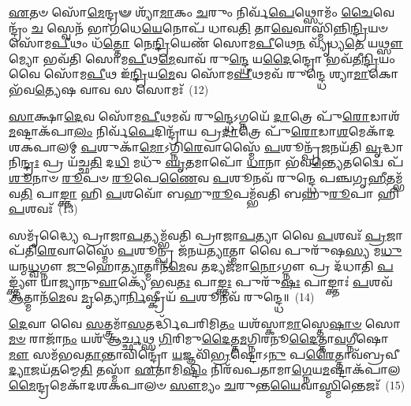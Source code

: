 \-\ul{𑌏}\-𑌤𑍞 𑌸𑍋᳴\-\ul{𑌮𑍇}\-𑌨𑍍𑌦𑍍𑌰𑍟 𑌶𑍍𑌯𑌾᳴\-\ul{𑌮𑌾}\-𑌕𑌂 \ul{𑌚}\-𑌰𑍁𑌂 𑌨𑌿𑌰𑍍𑌵᳴\-\ul{𑌪𑍇}\-𑌥𑍍𑌸𑍋𑌮𑌂᳴ \ul{𑌚𑍈}\-𑌵𑍇𑌨𑍍𑌦𑍍𑌰𑌂᳴ \ul{𑌚} 𑌸𑍍𑌵𑍇𑌨᳴ 𑌭𑌾\-\ul{𑌗}\-𑌧𑍇\-\ul{𑌯𑍇}\-𑌨𑍋𑌪᳴ 𑌧𑌾𑌵\-\ul{𑌤𑌿} 𑌤𑌾\-\ul{𑌵𑍇}\-𑌵𑌾𑌸𑍍𑌮𑌿᳴𑌨𑍍𑌨𑌿\-\ul{𑌨𑍍𑌦𑍍𑌰𑌿}\-𑌯𑍞 𑌸𑍋᳴𑌮\-\ul{𑌪𑍀}\-𑌥𑌂 𑌧᳴\-\ul{𑌤𑍍𑌤𑍋} 𑌨𑍇\-\ul{𑌨𑍍𑌦𑍍𑌰𑌿}\-𑌯𑍇𑌣᳴ 𑌸𑍋𑌮\-\ul{𑌪𑍀}\-𑌥𑍇\-\ul{𑌨} 𑌵𑍍𑌯𑍃᳴𑌧𑍍𑌯\-\ul{𑌤𑍇} 𑌯\-\ul{𑌥𑍍𑌸𑍗}\-𑌮𑍍𑌯𑍋 𑌭𑌵᳴𑌤𑌿 𑌸𑍋𑌮\-\ul{𑌪𑍀}\-𑌥\-\ul{𑌮𑍇}\-𑌵𑌾𑌵᳴ 𑌰𑍁\-\ul{𑌨𑍍𑌦𑍍𑌧𑍇} 𑌯\-\ul{𑌦𑍈}\-𑌨𑍍𑌦𑍍𑌰𑍋 𑌭𑌵᳴𑌤𑍀\-\ul{𑌨𑍍𑌦𑍍𑌰𑌿}\-𑌯𑌂 𑌵𑍈 𑌸𑍋᳴𑌮\-\ul{𑌪𑍀}\-𑌥 𑌇᳴\-\ul{𑌨𑍍𑌦𑍍𑌰𑌿}\-𑌯\-\ul{𑌮𑍇}\-𑌵 𑌸𑍋᳴𑌮\-\ul{𑌪𑍀}\-𑌥𑌮𑌵᳴ 𑌰𑍁𑌨𑍍𑌦𑍍𑌧𑍇 𑌶𑍍𑌯𑌾\-\ul{𑌮𑌾}\-𑌕𑍋 𑌭᳴𑌵\-\ul{𑌤𑍍𑌯𑍇}\-𑌷 𑌵𑌾𑌵 𑌸 𑌸𑍋𑌮𑌃᳴~(12)

\-\ul{𑌸𑌾}\-𑌕𑍍𑌷𑌾\-\ul{𑌦𑍇}\-𑌵 𑌸𑍋᳴𑌮\-\ul{𑌪𑍀}\-𑌥𑌮𑌵᳴ 𑌰𑍁\-\ul{𑌨𑍍𑌦𑍍𑌧𑍇}\-\-𑌽𑌗𑍍𑌨𑌯𑍇᳴ \ul{𑌦𑌾}\-𑌤𑍍𑌰𑍇 𑌪𑍁᳴\-\ul{𑌰𑍋}\-𑌡𑌾𑌶᳴\-\ul{𑌮}\-𑌷𑍍𑌟𑌾\-𑌕᳴𑌪𑌾\-\ul{𑌲𑌂} 𑌨𑌿𑌰𑍍𑌵᳴\-\ul{𑌪𑍇}\-𑌦𑌿𑌨𑍍𑌦𑍍𑌰𑌾᳴𑌯 𑌪𑍍𑌰\-\ul{𑌦𑌾}\-𑌤𑍍𑌰𑍇 𑌪𑍁᳴\-\ul{𑌰𑍋}\-𑌡𑌾\-\ul{𑌶}\-𑌮𑍇𑌕𑌾᳴\-𑌦𑌶\-𑌕𑌪𑌾𑌲𑌮𑍍 \ul{𑌪}\-𑌶𑍁𑌕𑌾᳴\-\ul{𑌮𑍋}\-\-𑌽𑌗𑍍𑌨𑌿\-\ul{𑌰𑍇}\-𑌵𑌾𑌸𑍍𑌮𑍈᳴ \ul{𑌪}\-𑌶𑍂𑌨𑍍𑌪𑍍𑌰᳴\-\ul{𑌜}\-𑌨𑌯᳴𑌤𑌿 \ul{𑌵𑍃}\-𑌦𑍍𑌧𑌾𑌨𑌿\-\ul{𑌨𑍍𑌦𑍍𑌰𑌃} 𑌪𑍍𑌰 𑌯᳴𑌚𑍍𑌛\-\ul{𑌤𑌿} 𑌦\-\ul{𑌧𑌿} 𑌮𑌧𑍁᳴ \ul{𑌘𑍃}\-𑌤𑌮𑌾𑌪𑍋᳴ \ul{𑌧𑌾}\-𑌨𑌾 𑌭᳴𑌵\-\ul{𑌨𑍍𑌤𑍍𑌯𑍇}\-𑌤𑌦𑍍𑌵𑍈 𑌪᳴\-\ul{𑌶𑍂}\-𑌨𑌾𑍞 \ul{𑌰𑍂}\-𑌪𑍞 \ul{𑌰𑍂}\-𑌪𑍇\-\ul{𑌣𑍈}\-𑌵 \ul{𑌪}\-𑌶𑍂𑌨𑌵᳴ 𑌰𑍁𑌨𑍍𑌦𑍍𑌧𑍇 𑌪𑌞𑍍𑌚𑌗𑍃\-\ul{𑌹𑍀}\-𑌤𑌮𑍍𑌭᳴𑌵\-\ul{𑌤𑌿} 𑌪𑌾\-\ul{𑌙𑍍𑌕𑍍𑌤𑌾} 𑌹𑌿 \ul{𑌪}\-𑌶𑌵𑍋᳴ 𑌬𑌹𑍁\-\ul{𑌰𑍂}\-𑌪𑌮𑍍𑌭᳴𑌵𑌤𑌿 𑌬𑌹𑍁\-\ul{𑌰𑍂}\-𑌪𑌾 𑌹𑌿 \ul{𑌪}\-𑌶𑌵𑌃᳴~(13)

𑌸𑌮𑍃᳴𑌦𑍍𑌧𑍍𑌯𑍈 𑌪𑍍𑌰𑌾𑌜𑌾\-\ul{𑌪}\-𑌤𑍍𑌯𑌮𑍍𑌭᳴𑌵𑌤𑌿 𑌪𑍍𑌰𑌾𑌜𑌾\-\ul{𑌪}\-𑌤𑍍𑌯𑌾 𑌵𑍈 \ul{𑌪}\-𑌶𑌵𑌃᳴ \ul{𑌪𑍍𑌰}\-𑌜𑌾𑌪᳴𑌤𑌿\-\ul{𑌰𑍇}\-𑌵𑌾𑌸𑍍𑌮𑍈᳴ \ul{𑌪}\-𑌶𑍂𑌨𑍍𑌪𑍍𑌰 𑌜᳴𑌨𑌯\-\ul{𑌤𑍍𑌯𑌾}\-𑌤𑍍𑌮𑌾 𑌵𑍈 𑌪𑍁𑌰𑍁᳴𑌷\-\ul{𑌸𑍍𑌯} 𑌮\-\ul{𑌧𑍁} 𑌯𑌨𑍍𑌮\-\ul{𑌧𑍍𑌵}\-𑌗𑍍𑌨𑍗 \ul{𑌜𑍁}\-𑌹𑍋\-\ul{𑌤𑍍𑌯𑌾}\-𑌤𑍍𑌮𑌾𑌨᳴\-\ul{𑌮𑍇}\-𑌵 𑌤𑌦𑍍𑌯𑌜᳴𑌮𑌾\-\ul{𑌨𑍋}\-\-𑌽𑌗𑍍𑌨𑍗 𑌪𑍍𑌰 𑌦᳴𑌧𑌾𑌤𑌿 \ul{𑌪}\-𑌙𑍍𑌕𑍍𑌤𑍍𑌯𑍗᳴ 𑌯𑌾𑌜𑍍𑌯𑌾𑌨𑍁\-\ul{𑌵𑌾}\-𑌕𑍍𑌯𑍇᳴ 𑌭𑌵\-\ul{𑌤𑌃} 𑌪𑌾\-\ul{𑌙𑍍𑌕𑍍𑌤𑌃} 𑌪𑍁𑌰𑍁᳴\-\ul{𑌷𑌃} 𑌪𑌾𑌙𑍍𑌕𑍍𑌤𑌾𑌃॑ \ul{𑌪}\-𑌶𑌵᳴ \ul{𑌆}\-𑌤𑍍𑌮𑌾𑌨᳴\-\ul{𑌮𑍇}\-𑌵 \ul{𑌮𑍃}\-𑌤𑍍𑌯𑍋\-\ul{𑌰𑍍𑌨𑌿}\-𑌷𑍍𑌕𑍍𑌰𑍀𑌯᳴ \ul{𑌪}\-𑌶𑍂𑌨𑌵᳴ 𑌰𑍁𑌨𑍍𑌦𑍍𑌧𑍇॥~(14)

{\anuvakamend[{\-\ul{𑌇}\-\-\ul{𑌨𑍍𑌦𑍍𑌰𑌿}\-𑌯𑍇॑\-𑌽\-\ul{𑌸𑍍𑌮𑌿}\-𑌨𑍍𑌭𑍂𑌮𑍍𑌯𑌾᳴ \ul{𑌏}\-𑌤𑌾𑌮𑌿\-\ul{𑌨𑍍𑌦𑍍𑌰𑌃} 𑌸𑍍𑌯𑌾𑌤𑍍𑌤\-\ul{𑌸𑍍𑌮𑍈} 𑌸𑍋𑌮𑍋᳴ 𑌬𑌹𑍁\-\ul{𑌰𑍂}\-𑌪𑌾 𑌹𑌿 \ul{𑌪}\-𑌶\-\ul{𑌵} 𑌏𑌕᳴𑌚𑌤𑍍𑌵𑌾𑌰𑌿𑍞𑌶𑌚𑍍𑌚}]}%

\-\ul{𑌦𑍇}\-𑌵𑌾 𑌵𑍈 \ul{𑌸}\-𑌤𑍍𑌤𑍍𑌰𑌮𑌾᳴\-\ul{𑌸}\-𑌤𑌰𑍍𑌦𑍍𑌧𑌿᳴𑌪𑌰𑌿𑌮𑌿\-\ul{𑌤𑌂} 𑌯𑌶᳴𑌸𑍍𑌕𑌾\-\ul{𑌮𑌾}\-𑌸𑍍𑌤𑍇\-\ul{𑌷𑌾}\-\-\ul{𑍞} 𑌸𑍋\-\ul{𑌮}\-\-\ul{𑍞} 𑌰𑌾𑌜𑌾᳴\-\ul{𑌨𑌂} 𑌯𑌶᳴ 𑌆\-\ul{𑌰𑍍𑌚𑍍𑌛}\-𑌥𑍍𑌸 \ul{𑌗𑌿}\-𑌰𑌿𑌮𑍁\-\ul{𑌦𑍈}\-𑌤𑍍𑌤\-\ul{𑌮}\-𑌗𑍍𑌨𑌿𑌰𑌨𑍂\-\ul{𑌦𑍈}\-𑌤𑍍𑌤𑌾\-\ul{𑌵}\-𑌗𑍍𑌨𑍀𑌷𑍋\-\ul{𑌮𑍗} 𑌸𑌮᳴𑌭𑌵\-\ul{𑌤𑌾}\-𑌨𑍍𑌤𑌾𑌵𑌿𑌨𑍍𑌦𑍍𑌰𑍋᳴ \ul{𑌯}\-𑌜𑍍𑌞𑌵𑌿᳴\-\ul{𑌭𑍍𑌰}\-𑌷𑍍𑌟𑍋\-𑌽\-\ul{𑌨𑍁} 𑌪\-\ul{𑌰𑍈}\-𑌤𑍍𑌤𑌾𑌵᳴𑌬𑍍𑌰𑌵𑍀\-\ul{𑌦𑍍𑌯𑌾}\-𑌜𑌯᳴\-\ul{𑌤}\-𑌮𑍍𑌮𑍇\-\ul{𑌤𑌿} 𑌤𑌸𑍍𑌮𑌾᳴ \ul{𑌏}\-𑌤𑌾𑌮𑌿\-\ul{𑌷𑍍𑌟𑌿𑌂} 𑌨𑌿𑌰᳴𑌵𑌪𑌤𑌾𑌮𑌾\-\ul{𑌗𑍍𑌨𑍇}\-𑌯\-\ul{𑌮}\-𑌷𑍍𑌟𑌾𑌕᳴𑌪𑌾𑌲\-\ul{𑌮𑍈}\-𑌨𑍍𑌦𑍍𑌰𑌮𑍇𑌕𑌾᳴\-𑌦𑌶\-𑌕𑌪𑌾𑌲𑍞 \ul{𑌸𑍗}\-𑌮𑍍𑌯𑌂 \ul{𑌚}\-𑌰𑍁𑌨𑍍𑌤\-\ul{𑌯𑍈}\-𑌵𑌾\-\ul{𑌸𑍍𑌮𑌿}\-𑌨𑍍𑌤𑍇𑌜𑌃᳴~(15)

